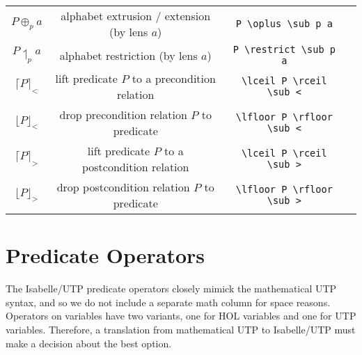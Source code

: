\documentclass[11pt]{article}
\begin{document}
\begin{center}
\begin{tabular}{|c|c|c|c|}
  $P \oplus_p a$                & alphabet extrusion / extension (by lens $a$)     & \verb|P \oplus \sub p a| \\
  $P \upharpoonleft_p a$        & alphabet restriction (by lens $a$)               & \verb|P \restrict \sub p a| \\
  $\lceil P \rceil_<$           & lift predicate $P$ to a precondition relation    & \verb|\lceil P \rceil \sub <| \\
  $\lfloor P \rfloor_<$         & drop precondition relation $P$ to predicate      & \verb|\lfloor P \rfloor \sub <| \\
  $\lceil P \rceil_>$           & lift predicate $P$ to a postcondition relation   & \verb|\lceil P \rceil \sub >| \\
  $\lfloor P \rfloor_>$         & drop postcondition relation $P$ to predicate     & \verb|\lfloor P \rfloor \sub >| \\
  \hline
\end{tabular}  
\end{center}

\newpage

\section{Predicate Operators}

The Isabelle/UTP predicate operators closely mimick the mathematical UTP syntax, and so we do not include a separate
math column for space reasons. Operators on variables have two variants, one for HOL variables and one for UTP
variables. Therefore, a translation from mathematical UTP to Isabelle/UTP must make a decision about the best option.
\end{document}
